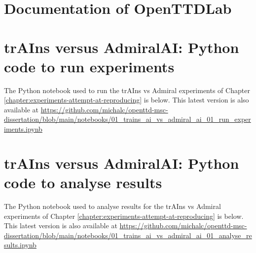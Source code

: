 \documentclass[logo,msc,dsti]{style/infthesis}    %
\begin{document}
{%



\printbibliography[heading=bibliography,title={Bibliography}]


\appendix

\chapter{Documentation of OpenTTDLab}
\label{chapter:openttdlab-documentation}



\chapter{trAIns versus AdmiralAI: Python code to run experiments}
\label{chapter:trains-vs-admiral-run-experiments}

The Python notebook used to run the trAIns vs Admiral experiments of Chapter \ref{chapter:experiments-attempt-at-reproducing} is below. This latest version is also available at \url{https://github.com/michalc/openttd-msc-dissertation/blob/main/notebooks/01_trains_ai_vs_admiral_ai_01_run_experiments.ipynb}



\chapter{trAIns versus AdmiralAI: Python code to analyse results}
\label{chapter:trains-vs-admiral-analyse-results}

The Python notebook used to analyse results for the trAIns vs Admiral experiments of Chapter \ref{chapter:experiments-attempt-at-reproducing} is below. This latest version is also available at \url{https://github.com/michalc/openttd-msc-dissertation/blob/main/notebooks/01_trains_ai_vs_admiral_ai_01_analyse_results.ipynb}

}
\end{document}
